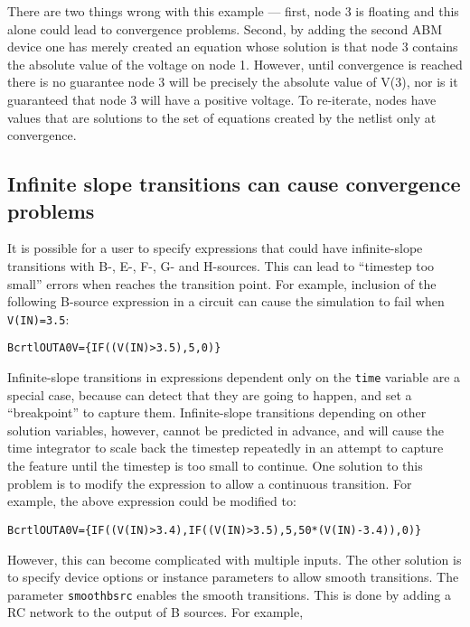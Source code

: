 There are two things wrong with this example --- first, node 3 is floating
and this alone could lead to convergence problems. Second, by adding
the second ABM device one has merely created an equation whose
solution is that node 3 contains the absolute value of the voltage on
node 1. However, until convergence is reached there is no guarantee
node 3 will be precisely the absolute value of V(3), nor is it
guaranteed that node 3 will have a positive voltage. To re-iterate, nodes have 
values that are solutions to the set of equations created by the netlist only at
convergence.

\subsection{Infinite slope transitions can cause convergence problems}

It is possible for a user to specify expressions that could have
infinite-slope transitions with B-, E-, F-, G- and H-sources.  This
can lead to ``timestep too small'' errors when \Xyce{} reaches the
transition point.  For example, inclusion of the following B-source
expression in a circuit can cause the simulation to fail when
\texttt{V(IN)=3.5}:
\begin{alltt} Bcrtl OUTA 0 V=\{ IF( (V(IN) > 3.5), 5, 0 ) \} \end{alltt}

Infinite-slope transitions in expressions dependent only on the
\texttt{time} variable are a special case, because \Xyce{} can detect
that they are going to happen, and set a ``breakpoint'' to capture
them.  Infinite-slope transitions depending on other solution
variables, however, cannot be predicted in advance, and will cause the
time integrator to scale back the timestep repeatedly in an attempt to
capture the feature until the timestep is too small to continue. One
solution to this problem is to modify the expression to allow a
continuous transition. For example, the above expression could be
modified to:
\begin{alltt} Bcrtl OUTA 0 V=\{IF( (V(IN) > 3.4), IF( (V(IN) > 3.5), 5, 50*(V(IN)-3.4) ), 0 )\}\end{alltt}

However, this can become complicated with multiple inputs. The other
solution is to specify device options or instance parameters to allow
smooth transitions. The parameter \texttt{smoothbsrc} enables the
smooth transitions. This is done by adding a RC network to the output
of B sources. For example,

